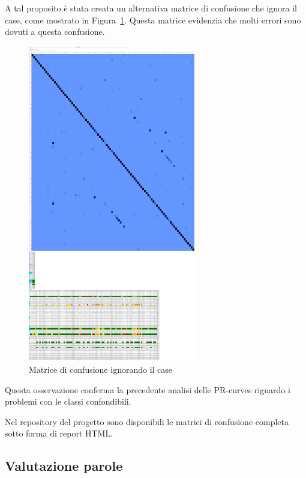 A tal proposito è stata creata un alternativa matrice di confusione che ignora il case, come mostrato in Figura~\ref{fig:confusion_matrix_case_insensitive}. Questa matrice evidenzia che molti errori sono dovuti a questa confusione.
\begin{figure}[htbp]
    \centering
    \includegraphics[width=0.65\textwidth]{images/confusion_matrix_case.png}
    \caption{Matrice di confusione ignorando il case}
    \label{fig:confusion_matrix_case_insensitive}
\end{figure}

Questa osservazione conferma la precedente analisi delle PR-curves riguardo i problemi con le classi confondibili.

Nel repository del progetto sono disponibili le matrici di confusione completa sotto forma di report HTML.

\subsection{Valutazione parole}
\label{sec:valutazione-stringhe}

